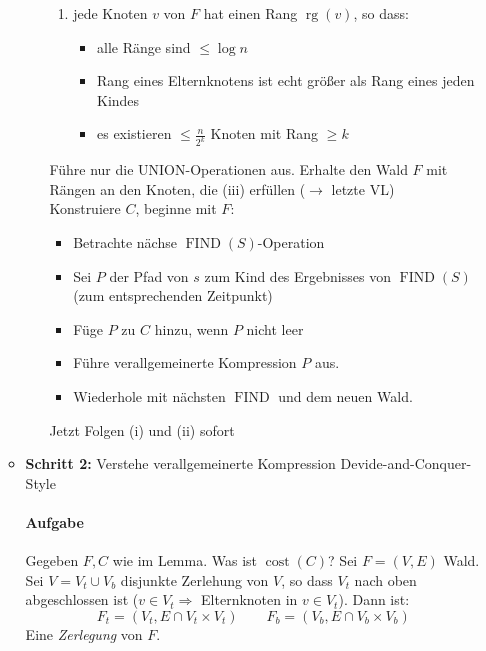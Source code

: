 \begin{itemize}
\begin{itemize}
\begin{itemize}
\begin{enumerate}
             \item jede Knoten $v$ von $F$ hat einen Rang $\operatorname{rg}(v)$, so dass:
                 \begin{itemize}
                 \item alle Ränge sind $\leq \log n$
                 \item Rang eines Elternknotens ist echt größer als Rang eines jeden Kindes
                 \item es existieren $\leq \frac{n}{2^k}$ Knoten mit Rang $\geq k$
                 \end{itemize}
            \end{enumerate}
            \Bew Führe nur die UNION-Operationen aus. Erhalte den Wald $F$ mit Rängen an den Knoten, die (iii) erfüllen ($\rightarrow$ letzte VL)\\
            Konstruiere $C$, beginne mit $F$:
            \begin{itemize}
             \item Betrachte nächse $\operatorname{FIND}(S)$-Operation
             \item Sei $P$ der Pfad von $s$ zum Kind des Ergebnisses von $\operatorname{FIND}(S)$ (zum entsprechenden Zeitpunkt)
             \item Füge $P$ zu $C$ hinzu, wenn $P$ nicht leer
             \item Führe verallgemeinerte Kompression $P$ aus.
             \item Wiederhole mit nächsten $\operatorname{FIND}$ und dem neuen Wald.
            \end{itemize}
            Jetzt Folgen (i) und (ii) sofort
      \end{itemize}
     \item \textbf{Schritt 2:} Verstehe verallgemeinerte Kompression Devide-and-Conquer-Style
         \paragraph*{Aufgabe} Gegeben $F, C$ wie im Lemma. Was ist $\operatorname{cost}(C)$?
         \Defi Sei $F = (V,E)$ Wald. Sei $V = V_t \cup V_b$ disjunkte Zerlehung von $V$, so dass $V_t$ nach oben abgeschlossen ist ($v \in V_t \Rightarrow$ Elternknoten in $v \in V_t$). Dann ist: 
         \[F_t = (V_t, E \cap V_t \times V_t) \qquad F_b = (V_b, E \cap V_b \times V_b)\]
         Eine \emph{Zerlegung} von $F$.

\end{itemize}
\end{itemize}
